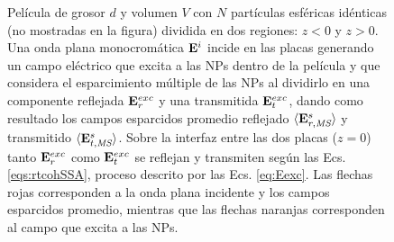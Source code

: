 \begin{figure}[h!]
\begin{tikzpicture}[scale=1]
\end{tikzpicture}
	\caption{ Película de grosor $d$ y volumen $V$ con $N$ partículas esféricas idénticas (no mostradas en la figura) dividida en dos regiones: $z<0$ y $z>0$. Una onda plana monocromática $\vb{E}^i$ incide en las placas  generando un campo eléctrico que excita a las NPs dentro de la película y que considera el esparcimiento múltiple de las NPs al dividirlo en una componente reflejada $\vb{E}^{exc}_r$ y una transmitida $\vb{E}^{exc}_t$, dando como resultado los campos esparcidos promedio reflejado $\langle\vb{E}_{r,\textit{MS}}^s\rangle$ y transmitido $\langle\vb{E}_{t,\textit{MS}}^s\rangle$. Sobre la interfaz entre las dos placas ($z=0$) tanto $\vb{E}^{exc}_r$ como $\vb{E}^{exc}_t$ se reflejan y transmiten según las Ecs. \eqref{eqs:rtcohSSA}, proceso descrito por las Ecs. \eqref{eq:Eexc}. Las flechas rojas corresponden a la onda plana incidente y los campos esparcidos promedio, mientras que las flechas naranjas corresponden al campo que excita a las NPs. }\label{fig:Eexc}
	\end{figure}	
	
